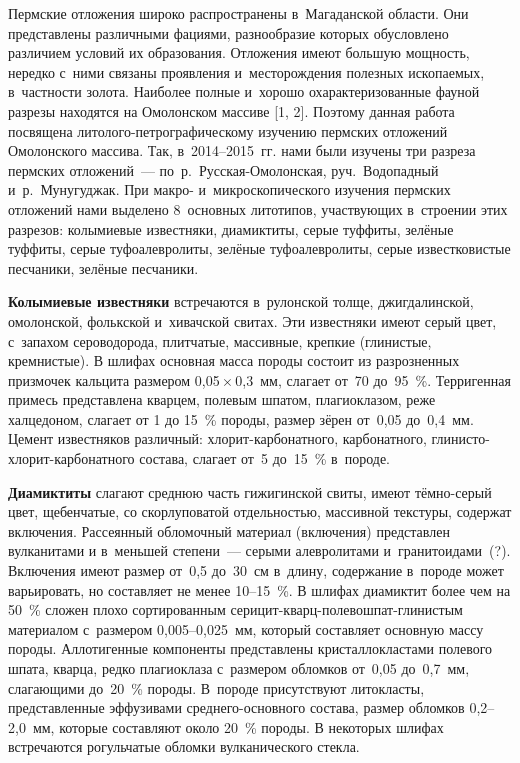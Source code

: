 




\makeProcTitleII
{}

\vspace{-10pt}
Пермские отложения широко распространены в~Магаданской области. Они представлены различными фациями, разнообразие которых обусловлено различием условий их образования. Отложения имеют большую мощность, нередко с~ними связаны проявления и~месторождения полезных ископаемых, в~частности золота. Наиболее полные и~хорошо охарактеризованные фауной разрезы находятся на Омолонском массиве [1, 2]. Поэтому данная работа посвящена литолого-петрографическому изучению пермских отложений Омолонского массива. Так, в~2014--2015~гг. нами были изучены три разреза пермских отложений~--- по~р.~Русская-Омолонская, руч.~Водопадный и~р.~Мунугуджак. При макро- и~микроскопического изучения пермских отложений нами выделено 8~основных литотипов, участвующих в~строении этих разрезов: колымиевые известняки, диамиктиты, серые туффиты, зелёные туффиты, серые туфоалевролиты, зелёные туфоалевролиты, серые известковистые песчаники, зелёные песчаники.

\textbf{Колымиевые известняки} встречаются в~рулонской толще, джигдалинской, омолонской, фолькской и~хивачской свитах. Эти известняки имеют серый цвет, с~запахом сероводорода, плитчатые, массивные, крепкие (глинистые, кремнистые). В шлифах основная масса породы состоит из разрозненных призмочек кальцита размером 0,05\,$\times$\,0,3~мм, слагает от~70 до~95~\%. Терригенная примесь представлена кварцем, полевым шпатом, плагиоклазом, реже халцедоном, слагает от 1 до 15~\% породы, размер зёрен от~0,05 до~0,4~мм. Цемент известняков различный: хлорит-карбонатного, карбонатного, глинисто-хлорит-карбонатного состава, слагает от~5 до~15~\% в~породе.

\textbf{Диамиктиты} слагают среднюю часть гижигинской свиты, имеют тёмно-серый цвет, щебенчатые, со скорлуповатой отдельностью, массивной текстуры, содержат включения. Рассеянный обломочный материал (включения) представлен вулканитами и в~меньшей степени~--- серыми алевролитами и~гранитоидами~(?). Включения имеют размер от~0,5 до~30~см в~длину, содержание в~породе может варьировать, но составляет не менее 10--15~\%. В шлифах диамиктит более чем на 50~\% сложен плохо сортированным серицит-кварц-полевошпат-глинистым материалом с~размером 0,005--0,025~мм, который составляет основную массу породы. Аллотигенные компоненты представлены кристаллокластами полевого шпата, кварца, редко плагиоклаза с~размером обломков от~0,05 до~0,7~мм, слагающими до~20~\% породы. В~породе присутствуют литокласты, представленные эффузивами среднего-основного состава, размер обломков 0,2--2,0~мм, которые составляют около 20~\% породы. В некоторых шлифах встречаются рогульчатые обломки вулканического стекла.

